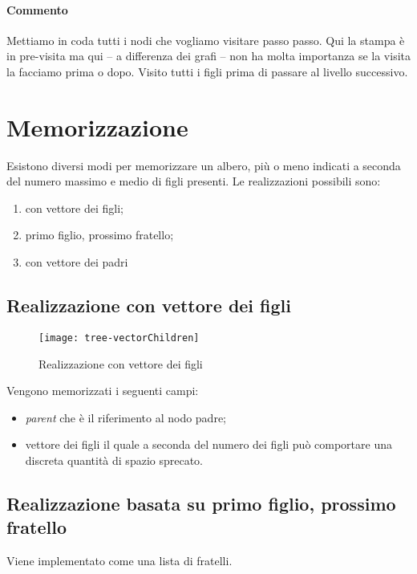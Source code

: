 \paragraph{Commento}
Mettiamo in coda tutti i nodi che vogliamo visitare passo passo.
Qui la stampa è in pre-visita ma qui -- a differenza dei grafi -- non ha molta importanza se la visita la facciamo prima o dopo.
Visito tutti i figli prima di passare al livello successivo.

\section{Memorizzazione}

Esistono diversi modi per memorizzare un albero, più o meno indicati a seconda del numero massimo e medio di figli presenti.
Le realizzazioni possibili sono:
\begin{enumerate}
	\item con vettore dei figli;
	\item primo figlio, prossimo fratello;
	\item con vettore dei padri
\end{enumerate}

\subsection{Realizzazione con vettore dei figli}

\begin{figure}[H]
	\centering
	\texttt{[image: tree-vectorChildren]}
	\caption[Realizzazione di un albero tramite vettore dei figli]{Realizzazione con vettore dei figli}
	\label{fig:tree-vector-children}
\end{figure}

Vengono memorizzati i seguenti campi:
\begin{itemize}
	\item \emph{parent} che è il riferimento al nodo padre;
	\item vettore dei figli il quale a seconda del numero dei figli può comportare una discreta quantità di spazio sprecato.
\end{itemize}

\subsection{Realizzazione basata su primo figlio, prossimo fratello}

Viene implementato come una lista di fratelli.

